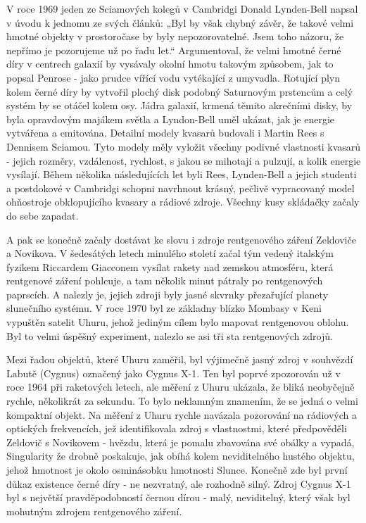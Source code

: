   V roce 1969 jeden ze Sciamových kolegů v Cambridgi Donald Lynden-Bell napsal v úvodu k jednomu ze
  svých článků: „Byl by však chybný závěr, že takové velmi hmotné objekty v prostoročase by byly
  nepozorovatelné. Jsem toho názoru, že nepřímo je pozorujeme už po řadu let.“ Argumentoval, že
  velmi hmotné černé díry v centrech galaxií by vysávaly okolní hmotu takovým způsobem, jak to
  popsal Penrose - jako prudce vířící vodu vytékající z umyvadla. Rotující plyn kolem černé díry by
  vytvořil plochý disk podobný Saturnovým prstencům a celý systém by se otáčel kolem osy. Jádra
  galaxií, krmená těmito akrečními disky, by byla opravdovým majákem světla a Lyndon-Bell uměl
  ukázat, jak je energie vytvářena a emitována. Detailní modely kvasarů budovali i Martin Rees s
  Dennisem Sciamou. Tyto modely měly vyložit všechny podivné vlastnosti kvasarů - jejich rozměry,
  vzdálenost, rychlost, s jakou se mihotají a pulzují, a kolik energie vysílají. Během několika
  následujících let byli Rees, Lynden-Bell a jejich studenti a postdokové v Cambridgi schopni
  navrhnout krásný, pečlivě vypracovaný model ohňostroje obklopujícího kvasary a rádiové zdroje.
  Všechny kusy skládačky začaly do sebe zapadat. 

  A pak se konečně začaly dostávat ke slovu i zdroje rentgenového záření Zeldoviče a Novikova. V
  šedesátých letech minulého století začal tým vedený italským fyzikem Riccardem Giacconem vysílat
  rakety nad zemskou atmosféru, která rentgenové záření pohlcuje, a tam několik minut pátraly po
  rentgenových paprscích. A nalezly je, jejich zdroji byly jasné skvrnky přezařující planety
  slunečního systému. V roce 1970 byl ze základny blízko Mombasy v Keni vypuštěn satelit Uhuru,
  jehož jediným cílem bylo mapovat rentgenovou oblohu. Byl to velmi úspěšný experiment, nalezlo se
  asi tři sta rentgenových zdrojů. 

  Mezi řadou objektů, které Uhuru zaměřil, byl výjimečně jasný zdroj v souhvězdí Labutě (Cygnus)
  označený jako Cygnus X-1. Ten byl poprvé zpozorován už v roce 1964 při raketových letech, ale
  měření z Uhuru ukázala, že bliká neobyčejně rychle, několikrát za sekundu. To bylo neklamným
  znamením, že se jedná o velmi kompaktní objekt. Na měření z Uhuru rychle navázala pozorování na
  rádiových a optických frekvencích, jež identifikovala zdroj s vlastnostmi, které předpověděli
  Zeldovič s Novikovem - hvězdu, která je pomalu zbavována své obálky a vypadá, Singularity že
  drobně poskakuje, jak obíhá kolem neviditelného hustého objektu, jehož hmotnost je okolo
  osminásobku hmotnosti Slunce. Konečně zde byl první důkaz existence černé díry - ne nezvratný, ale
  rozhodně silný. Zdroj Cygnus X-1 byl s největší pravděpodobností černou dírou - malý, neviditelný,
  který však byl mohutným zdrojem rentgenového záření. 


